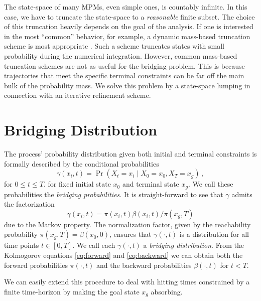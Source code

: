 The state-space of many \acp{MPM}, even simple ones, is countably infinite.
In this case, we have to truncate the state-space to a \emph{reasonable}
finite subset.
The choice of this truncation heavily depends on the goal of the
analysis.
If one is interested in the most ``common'' behavior, for example,
a dynamic mass-based truncation scheme is most appropriate \cite{mikeev2019approximate}.
Such a scheme truncates states with small probability during the numerical integration.
However, common mass-based truncation schemes are not as useful for the
bridging problem. This is because trajectories that meet
the specific terminal constraints can be far off the main bulk of the
probability mass.
We solve this problem by a state-space lumping in connection with an
iterative refinement scheme.


\section{Bridging Distribution}
The process' probability distribution given both initial and terminal constraints is formally described  by
the conditional probabilities
\begin{equation}\label{eq:bridge_dist}
    \gamma(x_i, t) = \Pr(X_t = x_i \mid X_0 = x_0, X_T = x_g)\,,
\end{equation}
for $0\leq t\leq T$.
for fixed initial state $x_0$ and terminal state $x_g$.
We call these probabilities the \emph{bridging probabilities}.
It is straight-forward to see that      $\gamma$ admits the
factorization
\begin{equation}\label{eq:bridge_fact}
    \gamma(x_i, t) = \pi(x_i, t)\beta(x_i, t)/\pi(x_g, T)
\end{equation}
due to the Markov property.
The normalization factor, given by the reachability probability $\pi(x_g, T)=\beta(x_0, 0)$, ensures that $\gamma(\cdot, t)$ is 
a distribution for all time points $t\in[0,T]$.
We call each $\gamma(\cdot, t)$ a   \emph{bridging distribution}.
From the Kolmogorov equations \eqref{eq:forward} and \eqref{eq:backward}
we can obtain both the forward probabilities $\pi(\cdot, t)$ and the backward probabilities
$\beta(\cdot, t)$ for $t< T$.


We can easily extend this procedure to deal with hitting times
constrained by a finite time-horizon by making the goal state $x_g$ absorbing.


